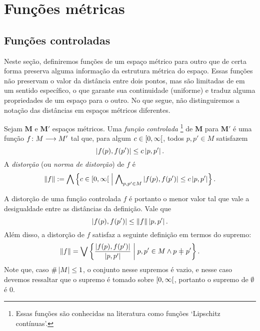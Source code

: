 \section{Funções métricas}

\subsection{Funções controladas}

Neste seção, definiremos funções de um espaço métrico para outro que de certa forma preserva alguma informação da estrutura métrica do espaço. Essas funções não preservam o valor da distância entre dois pontos, mas são limitadas de em um sentido específico, o que garante sua continuidade (uniforme) e traduz alguma propriedades de um espaço para o outro. No que segue, não distinguiremos a notação das distâncias em espaços métricos diferentes.

\begin{definition}
Sejam $\bm M$ e $\bm M'$ espaços métricos. Uma \emph{função controlada}%
	\footnote{Essas funções são conhecidas na literatura como funções `Lipschitz contínuas'.} %
de $\bm M$ para $\bm M'$ é uma função ${f}\colon {M} \longrightarrow {M'}$ tal que, para algum $c \in \left[{0},{\infty}\right[$,  todos $p,p' \in M$ satisfazem
	\begin{equation*}
	\left\vert{f(p)},{f(p')}\right\vert \leq c\left\vert{p},{p'}\right\vert.
	\end{equation*}
A \emph{distorção} (ou \emph{norma de distorção}) de $f$ é
	\begin{equation*}
	\left\Vert{f}\right\Vert := \bigwedge\left\{{c \in \left[{0},{\infty}\right[}\;\middle\vert\;{\bigwedge\nolimits_{p,p' \in M} \left\vert{f(p)},{f(p')}\right\vert \leq c\left\vert{p},{p'}\right\vert}\right\}.
	\end{equation*}
\end{definition}

A distorção de uma função controlada $f$ é portanto o menor valor tal que vale a desigualdade entre as distâncias da definição. Vale que
	\begin{equation*}
	\left\vert{f(p)},{f(p')}\right\vert \leq \left\Vert{f}\right\Vert\left\vert{p},{p'}\right\vert.
	\end{equation*}
Além disso, a distorção de $f$ satisfaz a seguinte definição em termos do supremo:
	\begin{equation*}
	\distor{f} = \sup \set{\frac{\dist{f(p)}{f(p')}}{\dist{p}{p'}}}{p,p' \in M \land p \neq p'}.
	\end{equation*}
Note que, caso $\#\left\lvert{M}\right\rvert \leq 1$, o conjunto nesse supremos é vazio, e nesse caso devemos ressaltar que o supremo é tomado sobre $\left[{0},{\infty}\right[$, portanto o supremo de $\emptyset$ é $0$.

